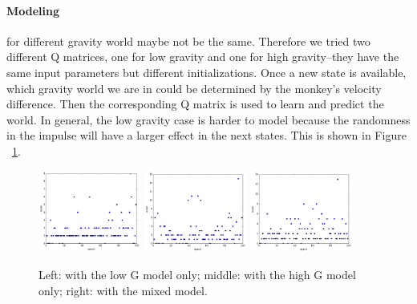 \documentclass[11pt]{article}
\begin{document}
\paragraph{Modeling} for different gravity world maybe not be the same. Therefore we tried two different Q matrices, one for low gravity and one for high gravity--they have the same input parameters but different initializations. Once a new state is available, which gravity world we are in could be determined by the monkey's velocity difference. Then the corresponding Q matrix is used to learn and predict the world. In general, the low gravity case is harder to model because the randomness in the impulse will have a larger effect in the next states. This is shown in Figure ~\ref{QModel}.
\begin{figure}[] 
\centering
        \includegraphics[width=0.3\textwidth]{Plot/learn_lowonly2.png}
        \includegraphics[width=0.3\textwidth]{Plot/learn_highonly2.png}
        \includegraphics[width=0.3\textwidth]{Plot/learn_mix.png}
        \caption{Left: with the low G model only; middle: with the high G model only; right: with the mixed model.}
            \label{QModel}
\end{figure}
\end{document}
